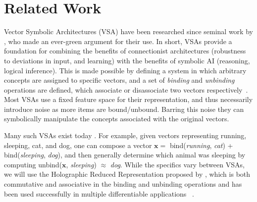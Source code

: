 \documentclass[letterpaper]{article} %
\begin{document}
\section{Related Work} \label{sec:related_work}
Vector Symbolic Architectures (VSA) have been researched since seminal work by \cite{SMOLENSKY1990159}, who made an ever-green argument for their use. In short, VSAs provide a foundation for combining the benefits of connectionist architectures (robustness to deviations in input, and learning) with the benefits of symbolic AI (reasoning, logical inference). This is made possible by defining a system in which arbitrary concepts are assigned to specific vectors, and a set of \textit{binding} and \textit{unbinding} operations are defined, which associate or disassociate two vectors respectively~\cite{Schlegel2021}. Most VSAs use a fixed feature space for their representation, and thus necessarily introduce noise as more items are bound/unbound. Barring this noise they can symbolically manipulate the concepts associated with the original vectors.
\par
Many such VSAs exist today \cite{Gosmann:2019:VTB:3334291.3334293, Gayler1998MultiplicativeBR, 10.1162/NECO_a_00467, 10.5555/646256.684603}. %
For example, given vectors representing running, sleeping, cat, and dog, one can compose a vector $\boldsymbol{x} = $ bind(\textit{running}, \textit{cat}) + bind(\textit{sleeping}, \textit{dog}), and then generally determine which animal was sleeping by computing unbind($\boldsymbol{x}$, \textit{sleeping}) $\approx$ \textit{dog}. While the specifics vary between VSAs, we will use the Holographic Reduced Representation proposed by \cite{b2}, which is both commutative and associative in the binding and unbinding operations and has been used successfully in multiple differentiable applications ~\cite{pmlr-v162-alam22a,pmlr-v202-alam23a,pmlr-v187-saul23a,menet2023mimo}.
\end{document}
